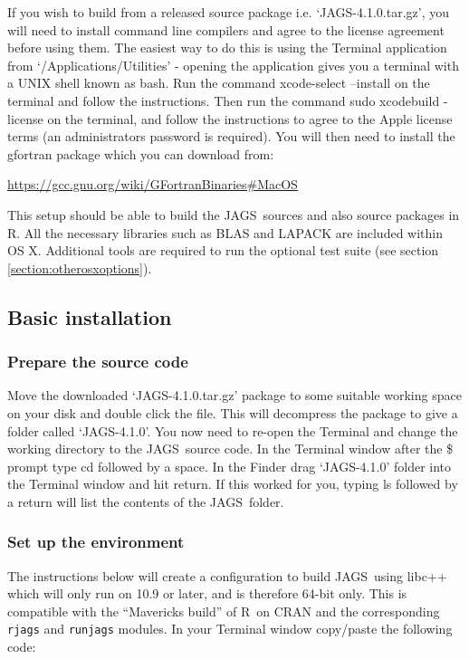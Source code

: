\documentclass[11pt, a4paper, titlepage]{article}
\newcommand{\release}{4.1.0}
\newcommand{\JAGS}{\textsf{JAGS}}
\newcommand{\R}{\textsf{R}}
\newcommand{\code}[1]{{\bgroup{\normalfont\ttfamily #1}\egroup}}
\newcommand{\file}[1]{{`\normalfont\textsf{#1}'}}
\begin{document}
If you wish to build from a released source package i.e.
\file{JAGS-\release.tar.gz}, you will need to install command line compilers
and agree to the license agreement before using them. The easiest way 
to do this is using the Terminal application from \file{/Applications/Utilities} 
- opening the application gives you a terminal with a UNIX shell known as bash.  
Run the command \code{xcode-select --install} on the terminal and follow the
instructions.  Then run the command \code{sudo xcodebuild -license} 
on the terminal, and follow the instructions to agree to the Apple
license terms (an administrators password is required).  You will then
need to install the gfortran package which you can download from:

\url{https://gcc.gnu.org/wiki/GFortranBinaries#MacOS}

This setup should be able to build the \JAGS\ sources and also source
packages in R.  All the necessary libraries such as BLAS and LAPACK are
included within OS X.  Additional tools are required to run the optional 
test suite (see section \ref{section:otherosxoptions}).


\subsection{Basic installation}


\subsubsection{Prepare the source code}

Move the downloaded \file{JAGS-\release.tar.gz} package to some suitable
working space on your disk and double click the file.  This will
decompress the package to give a folder called \file{JAGS-\release}.  
You now need to re-open the Terminal and
change the working directory to the \JAGS\ source code. In the Terminal
window after the \$ prompt type \code{cd} followed by a space.  In the Finder
drag \file{JAGS-\release} folder into the Terminal window and hit return.  If this
worked for you, typing \code{ls} followed by a return will list the contents
of the \JAGS\ folder.


\subsubsection{Set up the environment}
\label{section:osxenvironment}

The instructions below will create a configuration to build \JAGS\ using 
libc++ which will only run on 10.9 or later, and is therefore 64-bit only.
This is compatible with the ``Mavericks build'' of \R\ on CRAN and the 
corresponding \texttt{rjags} and \texttt{runjags} modules.  
In your Terminal window copy/paste the following code:
\end{document}
